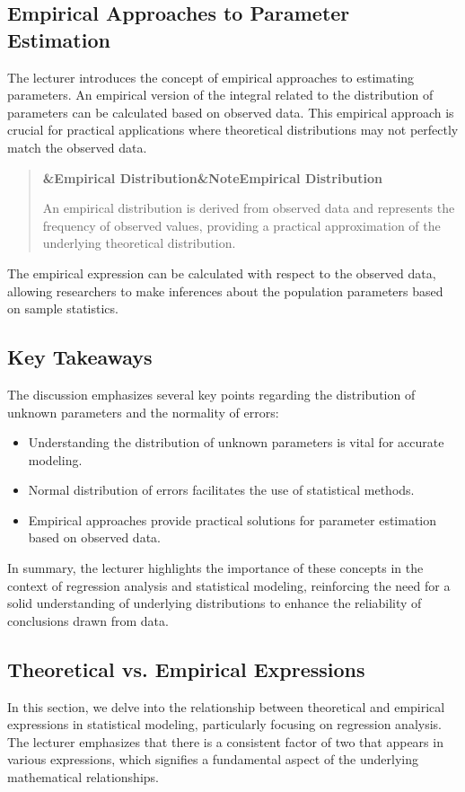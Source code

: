 \documentclass[a4paper]{article}
\newcommand{\boxheading}[1]{%
  \par\smallskip
  \noindent\textbf{\ifx&#1&Note\else#1\fi}\par
  \smallskip
}
\newenvironment{defbox}[1][]{%
  \begin{quote}\color{green!40!black}\boxheading{#1}\normalcolor
}{\end{quote}}
\begin{document}
\subsection{Empirical Approaches to Parameter Estimation}
The lecturer introduces the concept of empirical approaches to estimating parameters. An empirical version of the integral related to the distribution of parameters can be calculated based on observed data. This empirical approach is crucial for practical applications where theoretical distributions may not perfectly match the observed data.

\begin{defbox}[Empirical Distribution]
An empirical distribution is derived from observed data and represents the frequency of observed values, providing a practical approximation of the underlying theoretical distribution.
\end{defbox}

The empirical expression can be calculated with respect to the observed data, allowing researchers to make inferences about the population parameters based on sample statistics.

\subsection{Key Takeaways}
The discussion emphasizes several key points regarding the distribution of unknown parameters and the normality of errors:

\begin{itemize}
    \item Understanding the distribution of unknown parameters is vital for accurate modeling.
    \item Normal distribution of errors facilitates the use of statistical methods.
    \item Empirical approaches provide practical solutions for parameter estimation based on observed data.
\end{itemize}

In summary, the lecturer highlights the importance of these concepts in the context of regression analysis and statistical modeling, reinforcing the need for a solid understanding of underlying distributions to enhance the reliability of conclusions drawn from data.

\subsection{Theoretical vs. Empirical Expressions}
In this section, we delve into the relationship between theoretical and empirical expressions in statistical modeling, particularly focusing on regression analysis. The lecturer emphasizes that there is a consistent factor of two that appears in various expressions, which signifies a fundamental aspect of the underlying mathematical relationships.
\end{document}
